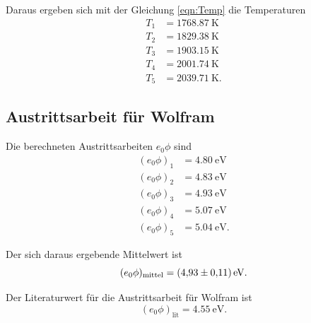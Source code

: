 \noindent Daraus ergeben sich mit der Gleichung \eqref{eqn:Temp} 
die Temperaturen
\begin{align*}
    T_\text{1} &= \SI{1768.87}{\kelvin} \\
    T_\text{2} &= \SI{1829.38}{\kelvin} \\
    T_\text{3} &= \SI{1903.15}{\kelvin} \\
    T_\text{4} &= \SI{2001.74}{\kelvin} \\
    T_\text{5} &= \SI{2039.71}{\kelvin}.
\end{align*}


\subsection{Austrittsarbeit für Wolfram}
Die berechneten Austrittsarbeiten $e_0 \phi$ sind
\begin{align*}
    (e_0 \phi)_\text{1} &= \SI{4.80}{\electronvolt} \\
    (e_0 \phi)_\text{2} &= \SI{4.83}{\electronvolt} \\
    (e_0 \phi)_\text{3} &= \SI{4.93}{\electronvolt} \\
    (e_0 \phi)_\text{4} &= \SI{5.07}{\electronvolt} \\
    (e_0 \phi)_\text{5} &= \SI{5.04}{\electronvolt}.
\end{align*}

\noindent Der sich daraus ergebende Mittelwert ist
\begin{equation*}
    (e_0 \phi)_\text{mittel} = \SI{4.93 \pm 0.11}{\electronvolt}.
\end{equation*}

\noindent Der Literaturwert für die Austrittsarbeit für
Wolfram \cite{wiki} ist %
\begin{equation*}
    (e_0 \phi)_\text{lit} = \SI{4.55}{\electronvolt}.
\end{equation*}